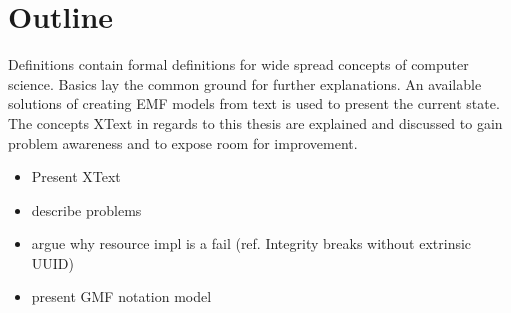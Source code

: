 \section{Outline}
Definitions contain formal definitions for wide spread concepts of computer science. Basics lay the common ground for further explanations. An available solutions of creating EMF models from text is used to present the current state. The concepts XText in regards to this thesis are explained and discussed to gain problem awareness and to expose room for improvement. 


\begin{itemize} 
	\item Present XText
	\item describe problems
	\item argue why resource impl is a fail (ref. Integrity breaks without extrinsic  UUID)
	\item present GMF notation model
\end{itemize}